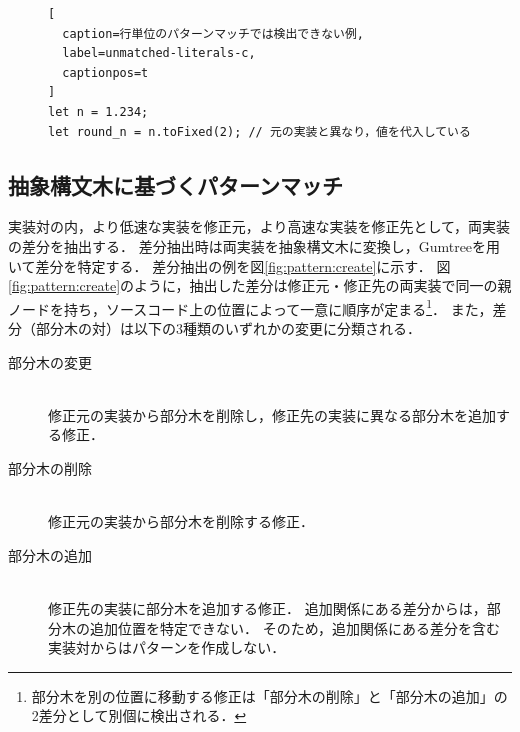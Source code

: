 \documentclass[11pt]{jreport}
\begin{document}
\begin{figure}[t]
\captionsetup{name=Listing}
\hspace{0.04\columnwidth}
\begin{minipage}[b]{0.96\linewidth}
\begin{lstlisting}[
  caption=行単位のパターンマッチでは検出できない例,
  label=unmatched-literals-c,
  captionpos=t
]
let n = 1.234;
let round_n = n.toFixed(2); // 元の実装と異なり，値を代入している
\end{lstlisting}
\end{minipage}
\end{figure}




\subsection{抽象構文木に基づくパターンマッチ}


実装対の内，より低速な実装を修正元，より高速な実装を修正先として，両実装の差分を抽出する．
差分抽出時は両実装を抽象構文木に変換し，Gumtree\cite{Falleri_2014}を用いて差分を特定する．
差分抽出の例を図\ref{fig:pattern:create}に示す．
図\ref{fig:pattern:create}のように，抽出した差分は修正元・修正先の両実装で同一の親ノードを持ち，ソースコード上の位置によって一意に順序が定まる\footnote{部分木を別の位置に移動する修正は「部分木の削除」と「部分木の追加」の2差分として別個に検出される．}．
また，差分（部分木の対）は以下の3種類のいずれかの変更に分類される．


\begin{description}

\item[部分木の変更]\mbox{}\\
修正元の実装から部分木を削除し，修正先の実装に異なる部分木を追加する修正．

\item[部分木の削除]\mbox{}\\
修正元の実装から部分木を削除する修正．

\item[部分木の追加]\mbox{}\\
修正先の実装に部分木を追加する修正．
追加関係にある差分からは，部分木の追加位置を特定できない．
そのため，追加関係にある差分を含む実装対からはパターンを作成しない．

\end{description}
\end{document}
